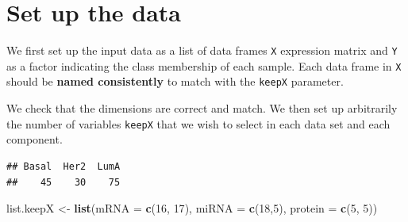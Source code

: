 \documentclass[]{book}
\newenvironment{Shaded}{\begin{snugshade}}{\end{snugshade}}
\newcommand{\CommentTok}[1]{\textcolor[rgb]{0.56,0.35,0.01}{\textit{#1}}}
\newcommand{\DataTypeTok}[1]{\textcolor[rgb]{0.13,0.29,0.53}{#1}}
\newcommand{\DecValTok}[1]{\textcolor[rgb]{0.00,0.00,0.81}{#1}}
\newcommand{\KeywordTok}[1]{\textcolor[rgb]{0.13,0.29,0.53}{\textbf{#1}}}
\newcommand{\NormalTok}[1]{#1}
\newcommand{\OperatorTok}[1]{\textcolor[rgb]{0.81,0.36,0.00}{\textbf{#1}}}
\newcommand{\StringTok}[1]{\textcolor[rgb]{0.31,0.60,0.02}{#1}}
\begin{document}
\hypertarget{set-up-the-data-2}{%
\section{Set up the data}\label{set-up-the-data-2}}

We first set up the input data as a list of data frames \texttt{X} expression matrix and \texttt{Y} as a factor indicating the class membership of each sample. Each data frame in \texttt{X} should be \textbf{named consistently} to match with the \texttt{keepX} parameter.

We check that the dimensions are correct and match. We then set up arbitrarily the number of variables \texttt{keepX} that we wish to select in each data set and each component.

\begin{Shaded}
\end{Shaded}

\begin{verbatim}
## Basal  Her2  LumA 
##    45    30    75
\end{verbatim}

\begin{Shaded}
\begin{Highlighting}[]
\NormalTok{list.keepX <-}\StringTok{ }\KeywordTok{list}\NormalTok{(}\DataTypeTok{mRNA =} \KeywordTok{c}\NormalTok{(}\DecValTok{16}\NormalTok{, }\DecValTok{17}\NormalTok{), }\DataTypeTok{miRNA =} \KeywordTok{c}\NormalTok{(}\DecValTok{18}\NormalTok{,}\DecValTok{5}\NormalTok{), }\DataTypeTok{protein =} \KeywordTok{c}\NormalTok{(}\DecValTok{5}\NormalTok{, }\DecValTok{5}\NormalTok{))}
\end{Highlighting}
\end{Shaded}
\end{document}
